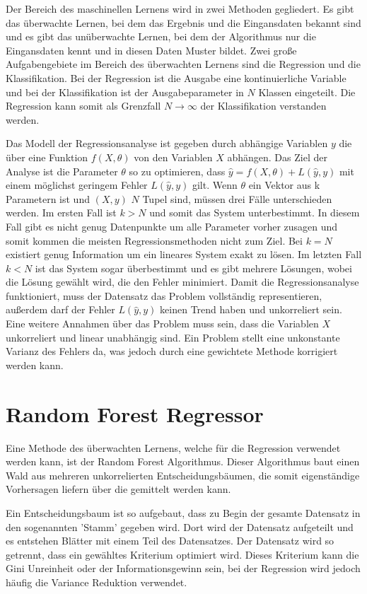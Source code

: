 Der Bereich des maschinellen Lernens wird in zwei Methoden gegliedert. Es gibt das überwachte Lernen, bei dem das Ergebnis und die Eingansdaten bekannt
sind und es gibt das unüberwachte Lernen, bei dem der Algorithmus nur die Eingansdaten kennt und in diesen Daten Muster bildet.
Zwei große Aufgabengebiete im Bereich des überwachten Lernens sind die Regression und die Klassifikation. Bei der Regression ist die Ausgabe eine
kontinuierliche Variable und bei der Klassifikation ist der Ausgabeparameter in $N$ Klassen eingeteilt. Die Regression kann somit als Grenzfall
$N \to \infty$ der Klassifikation verstanden werden.

Das Modell der Regressionsanalyse ist gegeben durch abhängige Variablen $y$ die über eine Funktion $f(X,\theta)$ von den Variablen $X$ abhängen.
Das Ziel der Analyse ist die Parameter $\theta$ so zu optimieren, dass $\hat{y} = f(X,\theta) + L(\hat{y},y)$ mit einem möglichst geringem Fehler
$L(\hat{y},y)$ gilt.
Wenn $\theta$ ein Vektor aus k Parametern ist und $(X,y)$ $N$ Tupel sind, müssen drei Fälle unterschieden werden.
Im ersten Fall ist $k>N$ und somit das System unterbestimmt.
In diesem Fall gibt es nicht genug Datenpunkte um alle Parameter vorher zusagen und somit kommen die meisten Regressionsmethoden
nicht zum Ziel.
Bei $k = N$ existiert genug Information um ein lineares System exakt zu lösen.
Im letzten Fall $k<N$ ist das System sogar überbestimmt und es gibt mehrere Lösungen, wobei die Lösung gewählt wird, die den Fehler minimiert.
Damit die Regressionsanalyse funktioniert, muss der Datensatz das Problem vollständig representieren, außerdem darf der Fehler $L(\hat{y},y)$ keinen Trend
haben und unkorreliert sein.
Eine weitere Annahmen über das Problem muss sein, dass die Variablen $X$ unkorreliert und linear unabhängig sind.
Ein Problem stellt eine unkonstante Varianz des Fehlers da, was jedoch durch eine gewichtete Methode korrigiert werden kann.

\section{Random Forest Regressor}

Eine Methode des überwachten Lernens, welche für die Regression verwendet werden kann, ist der Random Forest Algorithmus. Dieser Algorithmus baut
einen Wald aus mehreren unkorrelierten Entscheidungsbäumen, die somit eigenständige Vorhersagen liefern über die gemittelt werden kann.

Ein Entscheidungsbaum ist so aufgebaut, dass zu Begin der gesamte Datensatz in den sogenannten 'Stamm' gegeben wird. Dort wird der Datensatz aufgeteilt
und es entstehen Blätter mit einem Teil des Datensatzes. Der Datensatz wird so getrennt, dass ein gewähltes Kriterium optimiert wird. Dieses Kriterium
kann die Gini Unreinheit oder der Informationsgewinn sein, bei der Regression wird jedoch häufig die Variance Reduktion verwendet.

